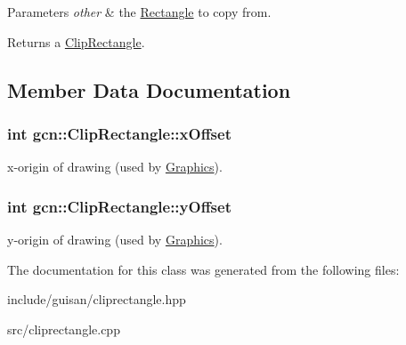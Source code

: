 \begin{DoxyParams}{Parameters}
{\em other} & the \hyperlink{classgcn_1_1Rectangle}{Rectangle} to copy from. \\
\hline
\end{DoxyParams}
\begin{DoxyReturn}{Returns}
a \hyperlink{classgcn_1_1ClipRectangle}{Clip\+Rectangle}. 
\end{DoxyReturn}


\subsection{Member Data Documentation}
\subsubsection[{\texorpdfstring{x\+Offset}{xOffset}}]{\setlength{\rightskip}{0pt plus 5cm}int gcn\+::\+Clip\+Rectangle\+::x\+Offset}\hypertarget{classgcn_1_1ClipRectangle_afe946bf9f906a4f571c9a6bdbd9fb730}{}\label{classgcn_1_1ClipRectangle_afe946bf9f906a4f571c9a6bdbd9fb730}
x-\/origin of drawing (used by \hyperlink{classgcn_1_1Graphics}{Graphics}). 
\subsubsection[{\texorpdfstring{y\+Offset}{yOffset}}]{\setlength{\rightskip}{0pt plus 5cm}int gcn\+::\+Clip\+Rectangle\+::y\+Offset}\hypertarget{classgcn_1_1ClipRectangle_a322306940b67c677e14cb0cab5b6eb3e}{}\label{classgcn_1_1ClipRectangle_a322306940b67c677e14cb0cab5b6eb3e}
y-\/origin of drawing (used by \hyperlink{classgcn_1_1Graphics}{Graphics}). 

The documentation for this class was generated from the following files\+:\begin{DoxyCompactItemize}
\item 
include/guisan/cliprectangle.\+hpp\item 
src/cliprectangle.\+cpp\end{DoxyCompactItemize}
